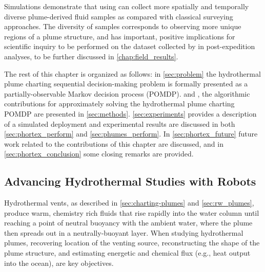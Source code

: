Simulations demonstrate that \Sentry using \PHORTEX can collect more spatially and temporally diverse plume-derived fluid samples as compared with classical surveying approaches. The diversity of samples corresponds to observing more unique regions of a plume structure, and has important, positive implications for scientific inquiry to be performed on the dataset collected by \Sentry in post-expedition analyses, to be further discussed in \cref{chap:field_results}. 

The rest of this chapter is organized as follows: in \cref{sec:problem} the hydrothermal plume charting sequential decision-making problem is formally presented as a partially-observable Markov decision process (POMDP). \PHORTEX and \PHUMES, the algorithmic contributions for approximately solving the hydrothermal plume charting POMDP are presented in \cref{sec:methods}. \cref{sec:experiments} provides a description of a simulated deployment and experimental results are discussed in both \cref{sec:phortex_perform} and \cref{sec:phumes_perform}. In \cref{sec:phortex_future} future work related to the contributions of this chapter are discussed, and in \cref{sec:phortex_conclusion} some closing remarks are provided. 

\subsection{Advancing Hydrothermal Studies with Robots}
\label{sec:phortex_charting}
Hydrothermal vents, as described in \cref{sec:charting-plumes} and \cref{sec:rw_plumes}, produce warm, chemistry rich fluids that rise rapidly into the water column until reaching a point of neutral buoyancy with the ambient water, where the plume then spreads out in a neutrally-buoyant layer. When studying hydrothermal plumes, recovering location of the venting source, reconstructing the shape of the plume structure, and estimating energetic and chemical flux (e.g., heat output into the ocean), are key objectives.

